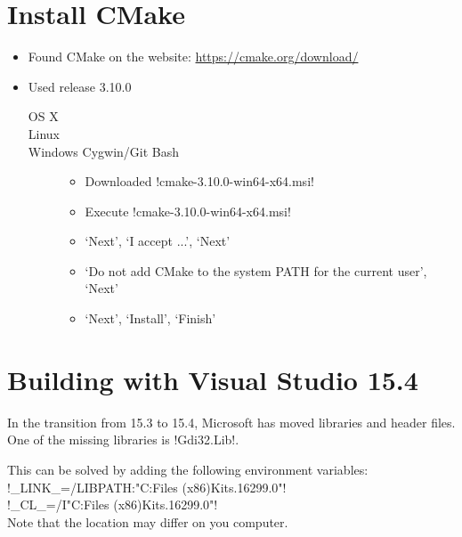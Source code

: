 \section{Install CMake}\label{sec:install_cmake}

\begin{itemize}
\item Found CMake on the website: \url{https://cmake.org/download/}
\item Used release 3.10.0
\begin{description}
    \item[OS X]
    \item[Linux]
    \item[Windows Cygwin/Git Bash]
    \begin{itemize}
        \item Downloaded !cmake-3.10.0-win64-x64.msi!
        \item Execute !cmake-3.10.0-win64-x64.msi!
        \item `Next', `I accept ...', `Next'
        \item `Do not add CMake to the system PATH for the current user', `Next'
        \item `Next', `Install', `Finish'
    \end{itemize}
\end{description}
\end{itemize}

\section{Building with Visual Studio 15.4}

In the transition from 15.3 to 15.4, Microsoft has moved libraries and header files.
One of the missing libraries is !Gdi32.Lib!.

This can be solved by adding the following environment variables:\\
!_LINK_=/LIBPATH:"C:\Program Files (x86)\Windows Kits\Lib{}.16299.0\um{}"!\\
!_CL_=/I"C:\Program Files (x86)\Windows Kits\Include{}.16299.0\um"!\\
Note that the location may differ on you computer.
